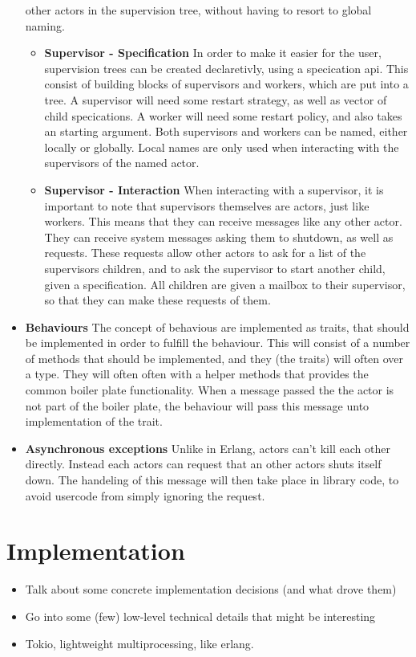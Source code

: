 \documentclass[a4paper]{article}
\begin{document}
\begin{itemize}
  other actors in the supervision tree, without having to resort to global
  naming.
  \begin{itemize}
  \item \textbf{Supervisor - Specification}
    In order to make it easier for the user, supervision trees can be created
    declaretivly, using a specication api. This consist of building blocks of
    supervisors and workers, which are put into a tree.
    A supervisor will need some restart strategy, as well as vector of child
    specications. A worker will need some restart policy, and also takes an
    starting argument. Both supervisors and workers can be named, either locally
    or globally. Local names are only used when interacting with the supervisors
    of the named actor. %
  \item \textbf{Supervisor - Interaction}
    When interacting with a supervisor, it is important to note that supervisors
    themselves are actors, just like workers. This means that they can receive
    messages like any other actor. They can receive system messages asking them to
    shutdown, as well as requests. These requests allow other actors to ask for a
    list of the supervisors children, and to ask the supervisor to start another
    child, given a specification. All children are given a mailbox to their
    supervisor, so that they can make these requests of them.
  \end{itemize}
\item \textbf{Behaviours}
  The concept of behavious are implemented as traits, that should be implemented
  in order to fulfill the behaviour. This will consist of a number of methods
  that should be implemented, and they (the traits) will often over a type. They
  will often often with a helper methods that provides the common boiler plate
  functionality. When a message passed the the actor is not part of the boiler
  plate, the behaviour will pass this message unto implementation of the trait.
\item \textbf{Asynchronous exceptions} %
  Unlike in Erlang, actors can't kill each other directly. Instead each
  actors can request that an other actors shuts itself down. The handeling of
  this message will then take place in library code, to avoid usercode from
  simply ignoring the request.
\end{itemize}

\section{Implementation}
\begin{itemize}
\item Talk about some concrete implementation decisions (and what drove them)
\item Go into some (few) low-level technical details that might be interesting
\item Tokio, lightweight multiprocessing, like erlang.
\end{itemize}
\end{document}
